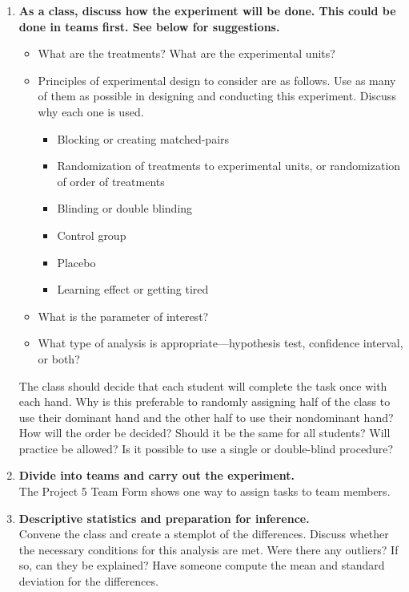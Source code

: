 \renewcommand{\labelenumi}{\textbf{Step \arabic{enumi}:}}
\begin{enumerate}[leftmargin=*, itemsep=.2em]
\item \textbf{As a class, discuss how the experiment will be done. This could be done in teams first. See below for suggestions.}

	\renewcommand{\labelitemi}{$\filledsquare$}
 	 \renewcommand{\labelitemii}{$\closedsucc$}
	\begin{itemize}  
	\item What are the treatments? What are the experimental units?
	\item Principles of experimental design to consider are as follows. Use as many of them as possible in designing and conducting this experiment. Discuss why each one is used.
		\begin{itemize}[leftmargin=1cm, itemsep=.2em]
		\item Blocking or creating matched-pairs
		\item Randomization of treatments to experimental units, or randomization of order of treatments
		\item Blinding or double blinding
		\item Control group
		\item Placebo
		\item Learning effect or getting tired
		\end{itemize}
	\item What is the parameter of interest?
	\item What type of analysis is appropriate---hypothesis test, confidence interval, or both?
	\end{itemize}
\renewcommand{\labelenumi}{\textbf{Step \arabic{enumi}:}}

The class should decide that each student will complete the task once with each hand. Why is this preferable to randomly assigning half of the class to use their dominant hand and the other half to use their nondominant hand? How will the order be decided? Should it be the same for all students? Will practice be allowed? Is it possible to use a single or double-blind procedure?

\item \textbf{Divide into teams and carry out the experiment.} \\
The Project 5 Team Form shows one way to assign tasks to team members. 

\item \textbf{Descriptive statistics and preparation for inference.} \\
Convene the class and create a stemplot of the differences. Discuss whether the necessary conditions for this analysis are met. Were there any outliers? If so, can they be explained? Have someone compute the mean and standard deviation for the differences.


\end{enumerate}

